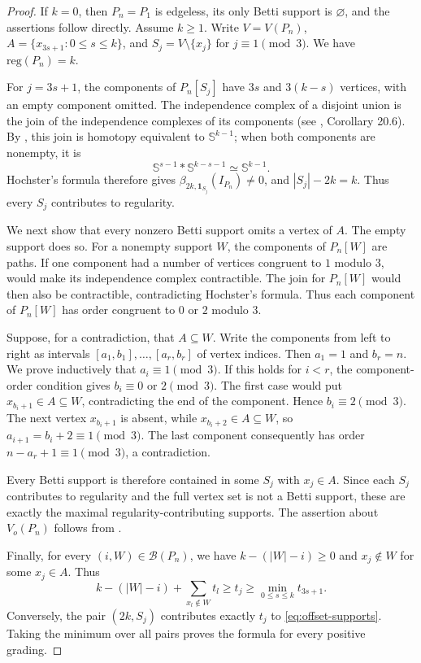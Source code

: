 \documentclass[dvipsnames,10pt]{article}
\begin{document}
\begin{proof}
    If $k=0$, then $P_n=P_1$ is edgeless, its only Betti support is $\varnothing$, and the assertions follow directly. Assume $k\geq1$. Write $V=V(P_n)$, $A=\{x_{3s+1}:0\leq s\leq k\}$, and $S_j=V\setminus\{x_j\}$ for $j\equiv1\pmod3$. We have $\mathrm{reg}(P_n)=k$.

    For $j=3s+1$, the components of $P_n[S_j]$ have $3s$ and $3(k-s)$ vertices, with an empty component omitted. The independence complex of a disjoint union is the join of the independence complexes of its components (see \cite{kozlov2008combinatorial}, Corollary 20.6). By , this join is homotopy equivalent to $\mathbb{S}^{k-1}$; when both components are nonempty, it is
    \[
        \mathbb{S}^{s-1}*\mathbb{S}^{k-s-1}\simeq\mathbb{S}^{k-1}.
    \]
    Hochster's formula therefore gives $\beta_{2k,\mathbf{1}_{S_j}}(I_{P_n})\neq0$, and $|S_j|-2k=k$. Thus every $S_j$ contributes to regularity.

    We next show that every nonzero Betti support omits a vertex of $A$. The empty support does so. For a nonempty support $W$, the components of $P_n[W]$ are paths. If one component had a number of vertices congruent to $1$ modulo $3$,  would make its independence complex contractible. The join for $P_n[W]$ would then also be contractible, contradicting Hochster's formula. Thus each component of $P_n[W]$ has order congruent to $0$ or $2$ modulo $3$.

    Suppose, for a contradiction, that $A\subseteq W$. Write the components from left to right as intervals $[a_1,b_1],\ldots,[a_r,b_r]$ of vertex indices. Then $a_1=1$ and $b_r=n$. We prove inductively that $a_i\equiv1\pmod3$. If this holds for $i<r$, the component-order condition gives $b_i\equiv0$ or $2\pmod3$. The first case would put $x_{b_i+1}\in A\subseteq W$, contradicting the end of the component. Hence $b_i\equiv2\pmod3$. The next vertex $x_{b_i+1}$ is absent, while $x_{b_i+2}\in A\subseteq W$, so $a_{i+1}=b_i+2\equiv1\pmod3$. The last component consequently has order $n-a_r+1\equiv1\pmod3$, a contradiction.

    Every Betti support is therefore contained in some $S_j$ with $x_j\in A$. Since each $S_j$ contributes to regularity and the full vertex set is not a Betti support, these are exactly the maximal regularity-contributing supports. The assertion about $V_o(P_n)$ follows from .

    Finally, for every $(i,W)\in\mathcal{B}(P_n)$, we have $k-(|W|-i)\geq0$ and $x_j\notin W$ for some $x_j\in A$. Thus
    \[
        k-(|W|-i)+\sum_{x_l\notin W}t_l
          \geq t_j\geq\min_{0\leq s\leq k}t_{3s+1}.
    \]
    Conversely, the pair $(2k,S_j)$ contributes exactly $t_j$ to \eqref{eq:offset-supports}. Taking the minimum over all pairs proves the formula for every positive grading.
\end{proof}
\end{document}
